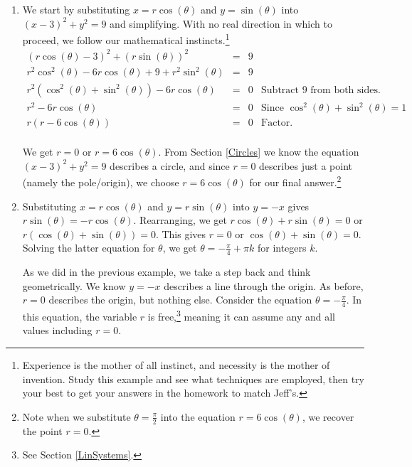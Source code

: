 \documentclass{ximera}
\begin{document}
\begin{ex}
\begin{enumerate}
\begin{enumerate}

\item We start by substituting  $x = r\cos(\theta)$ and $y = \sin(\theta)$ into $(x-3)^2 + y^2 = 9$ and simplifying.  With no real direction in which to proceed, we follow our mathematical instincts.\footnote{Experience is the mother of all instinct, and necessity is the mother of invention.  Study this example and see what techniques are employed, then try your best to get your answers in the homework to match Jeff's.}
\[ \begin{array}{rclr}

(r\cos(\theta) - 3)^2+ (r\sin(\theta))^2 & = & 9& \\[3pt]
r^2\cos^2(\theta) - 6 r\cos(\theta) + 9 + r^2 \sin^{2}(\theta) & = &  9 \\[3pt]
r^2\left(\cos^2(\theta) + \sin^{2}(\theta)\right) - 6 r\cos(\theta) & = & 0 & \text{Subtract $9$ from both sides.}\\[3pt]
r^2 - 6 r\cos(\theta) & = & 0 & \text{Since $\cos^2(\theta) + \sin^2(\theta) = 1$} \\[3pt]
r(r - 6 \cos(\theta)) & = & 0 &  \text{Factor.} \\ \end{array} \]

We get $r = 0$ or $r = 6\cos(\theta)$.  From Section \ref{Circles} we know the equation $(x-3)^2 + y^2 = 9$ describes a circle, and since $r=0$ describes just a point (namely the pole/origin), we choose $r = 6\cos(\theta)$ for our final answer.\footnote{Note when we substitute $\theta = \frac{\pi}{2}$ into the equation $r = 6\cos(\theta)$,  we recover the point $r = 0$.}

\item  Substituting $x = r\cos(\theta)$ and $y = r\sin(\theta)$ into $y=-x$ gives $r\sin(\theta)= -r\cos(\theta)$.  Rearranging, we get  $r\cos(\theta) + r\sin(\theta) = 0$ or $r(\cos(\theta) + \sin(\theta)) = 0$.  This gives $r=0$ or $\cos(\theta) + \sin(\theta) = 0$.  Solving the latter equation for $\theta$, we get $\theta = -\frac{\pi}{4} + \pi k$ for integers $k$. 

\smallskip

As we did in the previous example, we take a step back and think geometrically. We know $y=-x$ describes a line through the origin.  As before, $r=0$ describes the origin, but nothing else.  Consider the equation $\theta = -\frac{\pi}{4}$.  In this equation, the variable $r$ is free,\footnote{See Section \ref{LinSystems}.} meaning it can assume any and all values including $r=0$. 


\end{enumerate}
\end{enumerate}
\end{ex}
\end{document}

